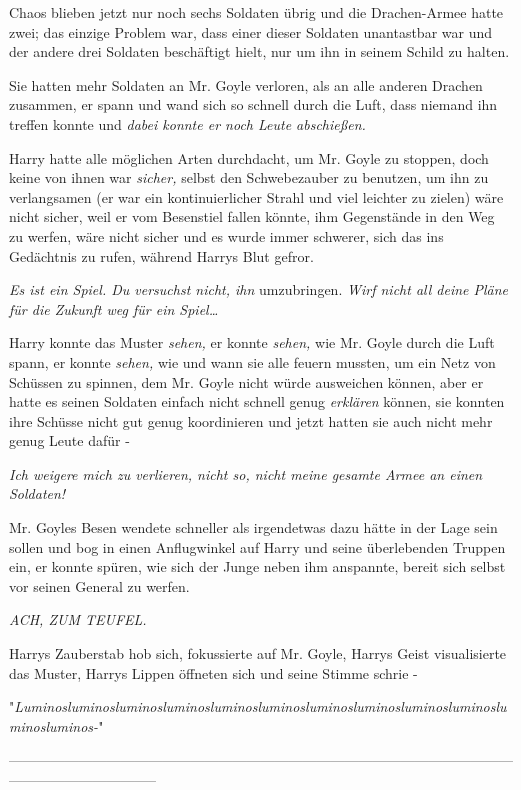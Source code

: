 {Chaos blieben jetzt nur noch sechs Soldaten übrig und die Drachen-Armee hatte zwei; das einzige Problem war, dass einer dieser Soldaten unantastbar war und der andere drei Soldaten beschäftigt hielt, nur um ihn in seinem Schild zu halten.

Sie hatten mehr Soldaten an Mr. Goyle verloren, als an alle anderen Drachen zusammen, er spann und wand sich so schnell durch die Luft, dass niemand ihn treffen konnte und \emph{dabei konnte er noch Leute abschießen.}

Harry hatte alle möglichen Arten durchdacht, um Mr. Goyle zu stoppen, doch keine von ihnen war \emph{sicher,} selbst den Schwebezauber zu benutzen, um ihn zu verlangsamen (er war ein kontinuierlicher Strahl und viel leichter zu zielen) wäre nicht sicher, weil er vom Besenstiel fallen könnte, ihm Gegenstände in den Weg zu werfen, wäre nicht sicher und es wurde immer schwerer, sich das ins Gedächtnis zu rufen, während Harrys Blut gefror.

\emph{Es ist ein Spiel. Du versuchst nicht, ihn} umzubringen. \emph{Wirf nicht all deine Pläne für die Zukunft weg für ein Spiel…}

Harry konnte das Muster \emph{sehen,} er konnte \emph{sehen,} wie Mr. Goyle durch die Luft spann, er konnte \emph{sehen,} wie und wann sie alle feuern mussten, um ein Netz von Schüssen zu spinnen, dem Mr. Goyle nicht würde ausweichen können, aber er hatte es seinen Soldaten einfach nicht schnell genug \emph{erklären} können, sie konnten ihre Schüsse nicht gut genug koordinieren und jetzt hatten sie auch nicht mehr genug Leute dafür -

\emph{Ich weigere mich zu verlieren, nicht so, nicht meine gesamte Armee an einen Soldaten!}

Mr. Goyles Besen wendete schneller als irgendetwas dazu hätte in der Lage sein sollen und bog in einen Anflugwinkel auf Harry und seine überlebenden Truppen ein, er konnte spüren, wie sich der Junge neben ihm anspannte, bereit sich selbst vor seinen General zu werfen.

\emph{ACH, ZUM TEUFEL.}

Harrys Zauberstab hob sich, fokussierte auf Mr. Goyle, Harrys Geist visualisierte das Muster, Harrys Lippen öffneten sich und seine Stimme schrie -

"\emph{Luminosluminosluminosluminosluminosluminosluminosluminosluminosluminosluminosluminos-}"

--------------------------------------------------------------------------------------------------------------------------------------------

}
